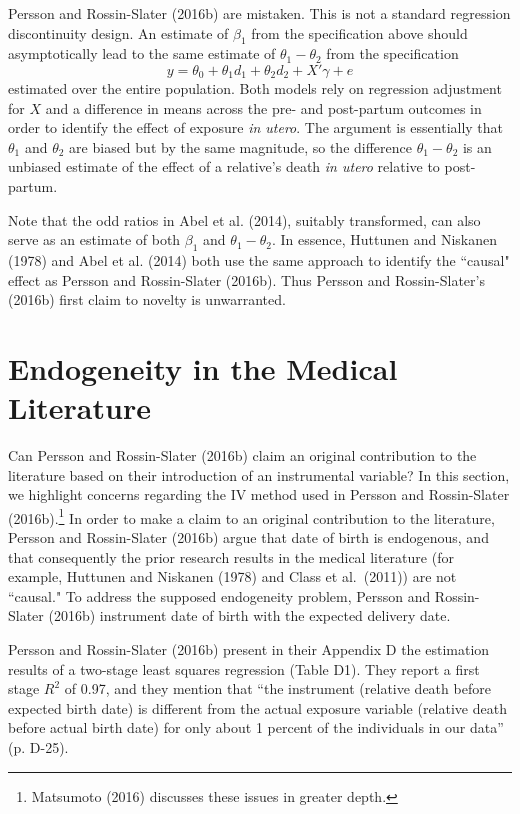 \documentclass[a4paper,12pt]{article}
\begin{document}
Persson and Rossin-Slater (2016b) are mistaken. This is not a standard regression discontinuity design. An estimate of $\beta_1$ from the specification above should asymptotically lead to the same estimate of $\theta_1-\theta_2$ from the specification
  \[
  	y=\theta_0+\theta_1 d_1+ \theta_2 d_2+X'\gamma+e
  \]
estimated over the entire population. Both models rely on regression adjustment for $X$ and a difference in means across the pre- and post-partum outcomes in order to identify the effect of exposure \emph{in utero}. The argument is essentially that $\theta_1$ and $\theta_2$ are biased but by the same magnitude, so the difference $\theta_1-\theta_2$ is an unbiased estimate of the effect of a relative's death \emph{in utero} relative to post-partum.

Note that the odd ratios in Abel et al. (2014), suitably transformed, can also serve as an estimate of both $\beta_1$ and $\theta_1-\theta_2$. In essence, Huttunen and Niskanen (1978) and Abel et al. (2014) both use the same approach to identify the ``causal" effect as Persson and Rossin-Slater (2016b). Thus Persson and Rossin-Slater's (2016b) first claim to novelty is unwarranted.

\section{Endogeneity in the Medical Literature}
\label{sec:endogeneity}

Can Persson and Rossin-Slater (2016b) claim an original contribution to the literature based on their introduction of an instrumental variable? In this section, we highlight concerns regarding the IV method used in Persson and Rossin-Slater (2016b).\footnote{Matsumoto (2016) discusses these issues in greater depth.} In order to make a claim to an original contribution to the literature, Persson and Rossin-Slater (2016b) argue that date of birth is endogenous, and that consequently the prior research results in the medical literature (for example, Huttunen and Niskanen (1978) and Class et al.~(2011)) are not ``causal." To address the supposed endogeneity problem,  Persson and Rossin-Slater (2016b)  instrument date of birth with the expected delivery date.

Persson and Rossin-Slater (2016b) present in their Appendix D the estimation results of  a two-stage least squares regression (Table D1). They report a first stage $R^2$ of 0.97, and they mention that ``the instrument (relative death before expected birth date) is different from the actual exposure variable (relative death before actual birth date) for only about 1 percent of the individuals in our data'' (p. D-25).
\end{document}
